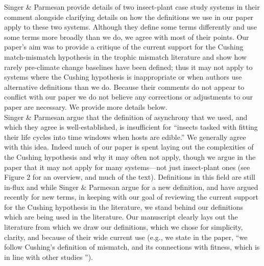 \documentclass[11pt,letter]{article}
\begin{document}

\renewcommand{\refname}{\CHead{}}

Singer \& Parmesan provide details of two insect-plant case study systems in their comment alongside clarifying details on how the definitions we use in our paper apply to these two systems. Although they define some terms differently and use some terms more broadly than we do, we agree with most of their points. Our paper's aim was to provide a critique of the current support for the Cushing match-mismatch hypothesis in the trophic mismatch literature and show how rarely pre-climate change baselines have been defined; thus it may not apply to systems where the Cushing hypothesis is inappropriate or when authors use alternative definitions than we do. Because their comments do not appear to conflict with our paper we do not believe any corrections or adjustments to our paper are necessary.  We provide more details below.\\

Singer \& Parmesan argue that the definition of asynchrony that we used, and which they agree is well-established, is insufficient for ``insects tasked with fitting their life cycles into time windows when hosts are edible.''  We generally agree with this idea. Indeed much of our paper is spent laying out the complexities of the Cushing hypothesis and why it may often not apply, though we argue in the paper that it may not apply for many systems---not just insect-plant ones (see Figure 2 for an overview, and much of the text). Definitions in this field are still in-flux and while Singer \& Parmesan argue for a new definition, and \citet{vissergienapp2019} have argued recently for new terms, in keeping with our goal of reviewing the current support for the Cushing hypothesis in the literature, we stand behind our definitions which are being used in the literature. Our manuscript clearly lays out the literature from which we draw our definitions, which we chose for simplicity, clarity, and because of their wide current use (e.g., we state in the paper, ``we follow Cushing's definition of mismatch, and its connections with fitness, which is in line with other studies \citep{Johansson2015,durant2007,kerby2012}''). \\
\end{document}

